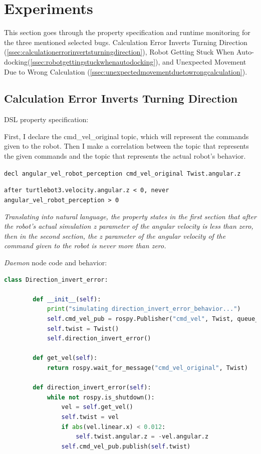 \section{Experiments}
\label{sec:experiments}

This section goes through the property specification and runtime monitoring for the three mentioned selected bugs. Calculation Error Inverts Turning Direction (\autoref{ssec:calculationerrorinvertsturningdirection}), Robot Getting Stuck When Auto-docking(\autoref{ssec:robotgettingstuckwhenautodocking}), and Unexpected Movement Due to Wrong Calculation (\autoref{ssec:unexpectedmovementduetowrongcalculation}).


\subsection{Calculation Error Inverts Turning Direction}
\label{ssec:calculationerrorinvertsturningdirection}

DSL property specification:

First, I declare the cmd\_vel\_original topic, which will represent the commands given to the robot.
Then I make a correlation between the topic that represents the given commands and the topic that represents the actual robot's behavior.

\texttt{decl angular\_vel\_robot\_perception cmd\_vel\_original Twist.angular.z}

\texttt{after turtlebot3.velocity.angular.z < 0, never angular\_vel\_robot\_perception > 0}

\textit{Translating into natural language, the property states in the first section that after the robot's actual simulation z parameter of the angular velocity is less than zero, then in the second section, the z parameter of the angular velocity of the command given to the robot is never more than zero.}

\textit{Daemon} node code and behavior:

\begin{lstlisting}[language=Python]
    class Direction_invert_error:

        def __init__(self):
            print("simulating direction_invert_error_behavior...")
            self.cmd_vel_pub = rospy.Publisher("cmd_vel", Twist, queue_size=1)
            self.twist = Twist()
            self.direction_invert_error()

        def get_vel(self):
            return rospy.wait_for_message("cmd_vel_original", Twist)

        def direction_invert_error(self):
            while not rospy.is_shutdown():
                vel = self.get_vel()
                self.twist = vel
                if abs(vel.linear.x) < 0.012:
                    self.twist.angular.z = -vel.angular.z
                self.cmd_vel_pub.publish(self.twist)
\end{lstlisting}

